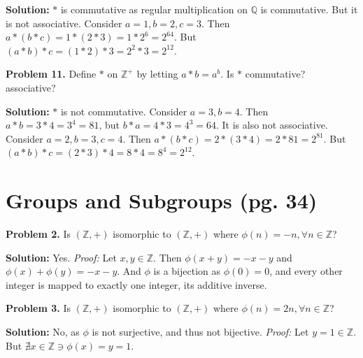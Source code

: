 \documentclass[12pt, letterpaper]{article}
\newenvironment{problem}
    [1]
    {\noindent \textbf{Problem #1.}}
    {\vspace{3mm}}
\newenvironment{solution}
    [0]
    {\noindent \textbf{Solution:}} 
    {\vspace{3mm}}
\begin{document}
    \begin{solution}
        $*$ is commutative as regular multiplication on $\mathbb{Q}$ is commutative.
        But it is not associative. Consider $a=1, b=2, c=3$. Then $a * (b * c) = 
        1 * (2 * 3) = 1 * 2^6 = 2^{64}$. But $(a * b) * c = (1 * 2) * 3 = 2^2 * 3 =
        2^{12}$.
    \end{solution}

    \begin{problem}{11}
        Define $*$ on $\mathbb{Z}^+$ by letting $a*b=a^b$. Is $*$ commutative?
        associative?
    \end{problem}

    \begin{solution}
        $*$ is not commutative. Consider $a=3,b=4$. Then $a * b = 3 * 4 = 3^4 = 81$,
        but $b * a = 4 * 3 = 4^3 = 64$. It is also not associative. Consider 
        $a=2, b=3, c=4$. Then $a * (b * c) = 2 * (3 * 4) = 2 * 81 = 2^{81}$. 
        But $(a * b) * c = (2 * 3) * 4 = 8 * 4 = 8^4 = 2^{12}$.
    \end{solution}

\section{Groups and Subgroups (pg. 34)}
    \begin{problem}{2}
        Is $(\mathbb{Z}, +)$ isomorphic to $(\mathbb{Z}, +)$ where $\phi(n)=-n, \forall n \in \mathbb{Z}$?
    \end{problem}

    \begin{solution}
        Yes. \emph{Proof:} Let $x, y \in \mathbb{Z}$. Then $\phi(x + y)=-x-y$ and $\phi(x)+\phi(y)=-x-y$.
        And $\phi$ is a bijection as $\phi(0) = 0$, and every other integer is mapped to exactly one integer,
        its additive inverse.
    \end{solution}

    \begin{problem}{3}
        Is $(\mathbb{Z}, +)$ isomorphic to $(\mathbb{Z}, +)$ where $\phi(n)=2n, \forall n \in \mathbb{Z}$?
    \end{problem}

    \begin{solution}
        No, as $\phi$ is not surjective, and thus not bijective. \emph{Proof:} Let $y = 1 \in \mathbb{Z}$.
        But $\nexists x \in \mathbb{Z} \ni \phi(x) = y = 1$.
    \end{solution}
\end{document}
